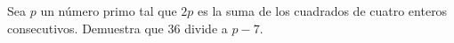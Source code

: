 Sea $p$ un número primo tal que $2p$ es la suma de los cuadrados de cuatro enteros consecutivos. Demuestra que $36$ divide a $p - 7$.
